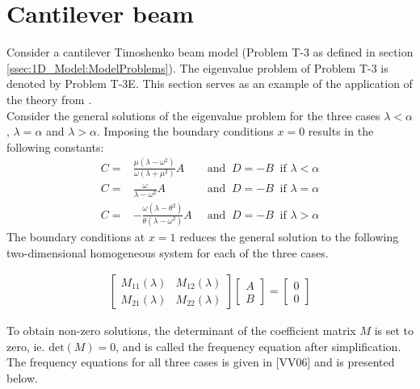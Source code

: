 \documentclass[../../main.tex]{subfiles}
\begin{document}
\section{Cantilever beam} \label{sec:Timo:Cantilever}
Consider a cantilever Timoshenko beam model (Problem T-3 as defined in section \ref{ssec:1D_Model:ModelProblems}). The eigenvalue problem of Problem T-3 is denoted by Problem T-3E. This section serves as an example of the application of the theory from \cite{VV06}.\\

Consider the general solutions of the eigenvalue problem for the three cases $\lambda < \alpha$, $\lambda = \alpha$ and $\lambda > \alpha$. Imposing the boundary conditions $x = 0$ results in the following constants:
\begin{align}
	C = & \frac{\mu(\lambda-\omega^2)}{\omega(\lambda+\mu^2)}A  \  &\textrm{ and } \ D = -B  \ \textrm{ if } \lambda < \alpha \label{A1}\\
	C = & \frac{\omega}{\lambda - \omega^2}A  \  &\textrm{ and } \ D = -B  \ \textrm{ if } \lambda = \alpha \label{A2}\\
	C = & -\frac{\omega(\lambda-\theta^2)}{\theta(\lambda-\omega^2)}A  \  &\textrm{ and } \ D = -B  \ \textrm{ if } \lambda > \alpha \label{A3}
\end{align}
The boundary conditions at $x = 1$ reduces the general solution to the following two-dimensional homogeneous system for each of the three cases.

\begin{align}
	\begin{bmatrix}
		M_{11}(\lambda) & M_{12}(\lambda)\\
		M_{21}(\lambda) & M_{22}(\lambda)
	\end{bmatrix}
	\begin{bmatrix}
		A\\
		B
	\end{bmatrix}
	= 
	\begin{bmatrix}
		0\\
		0
	\end{bmatrix}
\label{eq:Timo:Cantilever:SystemOfEquations}
\end{align}

To obtain non-zero solutions, the determinant of the coefficient matrix $M$ is set to zero, ie. $\textrm{det}(M) = 0$, and is called the frequency equation after simplification. The frequency equations for all three cases is given in [VV06] and is presented below.\\
\end{document}
